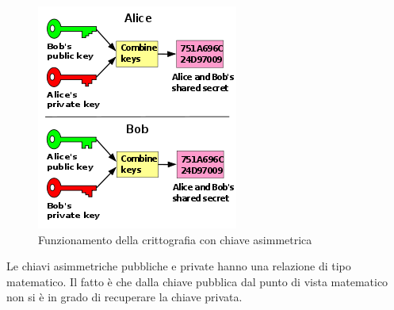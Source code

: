 \begin{figure}[H]
\centering
\includegraphics[scale=0.65]{res/img/asymmetric.png}
\caption{Funzionamento della crittografia con chiave asimmetrica}
\label{fig:password:asymmetric}
\end{figure}

Le chiavi asimmetriche pubbliche e private hanno una relazione di tipo
matematico. Il fatto è che dalla chiave pubblica dal punto di vista matematico
non si è in grado di recuperare la chiave privata.
